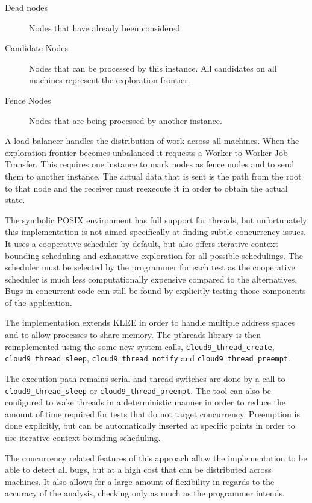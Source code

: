 \documentclass[10pt]{llncs}
\begin{document}
\begin{description}
	\item[Dead nodes] Nodes that have already been considered
	\item[Candidate Nodes] Nodes that can be processed by this instance. All candidates on all machines represent the exploration frontier.
	\item[Fence Nodes] Nodes that are being processed by another instance.
\end{description}

A load balancer handles the distribution of work across all machines. When the exploration frontier becomes unbalanced it requests a Worker-to-Worker Job Transfer. This requires one instance to mark nodes as fence nodes and to send them to another instance. The actual data that is sent is the path from the root to that node and the receiver must reexecute it in order to obtain the actual state.

The symbolic POSIX environment has full support for threads, but unfortunately this implementation is not aimed specifically at finding subtle concurrency issues. It uses a cooperative scheduler by default, but also offers iterative context bounding scheduling \cite{Musuvathi} and exhaustive exploration for all possible schedulings. The scheduler must be selected by the programmer for each test as the cooperative scheduler is much less computationally expensive compared to the alternatives. Bugs in concurrent code can still be found by explicitly testing those components of the application.

The implementation extends KLEE in order to handle multiple address spaces and to allow processes to share memory. The pthreads library is then reimplemented using the some new system calls, \texttt{cloud9\_thread\_create}, \texttt{cloud9\_thread\_sleep}, \texttt{cloud9\_thread\_notify} and \texttt{cloud9\_thread\_preempt}.

The execution path remains serial and thread switches are done by a call to \texttt{cloud9\_thread\_sleep} or \texttt{cloud9\_thread\_preempt}. The tool can also be configured to wake threads in a deterministic manner in order to reduce the amount of time required for tests that do not target concurrency. Preemption is done explicitly, but can be automatically inserted at specific points in order to use iterative context bounding scheduling.

The concurrency related features of this approach allow the implementation to be able to detect all bugs, but at a high cost that can be distributed across machines. It also allows for a large amount of flexibility in regards to the accuracy of the analysis, checking only as much as the programmer intends.
\end{document}
